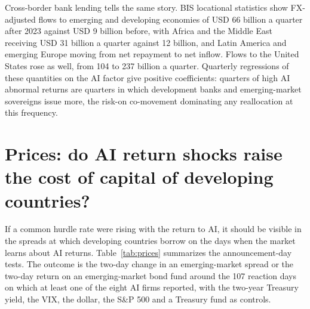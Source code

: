 \documentclass[AER]{AEA}
\begin{document}
Cross-border bank lending tells the same story. BIS locational statistics show FX-adjusted flows to emerging and developing economies of USD 66 billion a quarter after 2023 against USD 9 billion before, with Africa and the Middle East receiving USD 31 billion a quarter against 12 billion, and Latin America and emerging Europe moving from net repayment to net inflow. Flows to the United States rose as well, from 104 to 237 billion a quarter. Quarterly regressions of these quantities on the AI factor give positive coefficients: quarters of high AI abnormal returns are quarters in which development banks and emerging-market sovereigns issue more, the risk-on co-movement dominating any reallocation at this frequency.

\section{Prices: do AI return shocks raise the cost of capital of developing countries?}\label{sec:prices}

If a common hurdle rate were rising with the return to AI, it should be visible in the spreads at which developing countries borrow on the days when the market learns about AI returns. Table~\ref{tab:prices} summarizes the announcement-day tests. The outcome is the two-day change in an emerging-market spread or the two-day return on an emerging-market bond fund around the 107 reaction days on which at least one of the eight AI firms reported, with the two-year Treasury yield, the VIX, the dollar, the S\&P 500 and a Treasury fund as controls.
\end{document}
